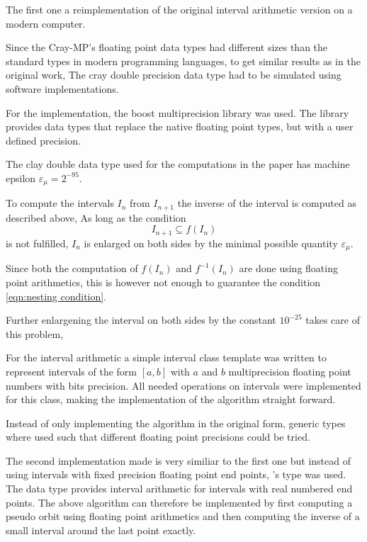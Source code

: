   The first one a reimplementation of the original interval arithmetic version
  on a modern computer.
  
  Since the Cray-MP's floating point data types had different sizes than the
  standard types in modern programming languages, to get similar results as
  in the original work,  The cray double precision data type had to be
  simulated using software implementations.
  
  For the \cc implementation, the boost multiprecision library \cite{boostmultiprecision} was used. 
  The library provides data types that replace the native \cc floating point types, but with a user defined precision. 
 
  The clay double data type used for the computations in the paper has machine epsilon
  $\varepsilon_\mu = 2^{-95}$.

  To compute the intervals $I_n$ from $I_{n+1}$ the inverse of the interval is
  computed as described above, 
  As long as the condition 
  \begin{equation}\label{eqn:nesting condition}  
    I_{n+1} \subseteq f(I_n) 
  \end{equation}
  is not fulfilled, $I_n$ is enlarged on both sides by the minimal possible quantity $\varepsilon_\mu$. 

  Since both the computation of $f(I_n)$ and $f^{-1}(I_n)$ are done using
  floating point arithmetics, this is however not enough to guarantee the condition
  \ref{eqn:nesting condition}.
  
  Further enlargening the interval on both sides by the constant $10^{-25}$
  takes care of this problem,
  
  For the interval arithmetic a simple interval class template
   was written to represent
  intervals of the form $[a,b]$ with $a$ and $b$ multiprecision floating point
  numbers with  bits precision. 
  All needed operations on intervals were implemented for this class, making
  the implementation of the algorithm straight forward.

  Instead of only implementing the algorithm in the original form, generic
  types where used such that different floating point precisions could be
  tried.

  The second implementation made is very similiar to the first one but instead
  of using intervals with fixed precision floating point end points, \irram's
   type was used.
  The data type provides interval arithmetic for intervals with real numbered end points. 
  The above algorithm can therefore be implemented by first computing a pseudo
  orbit using floating point arithmetics and then computing the inverse of a
  small interval around the last point exactly.

